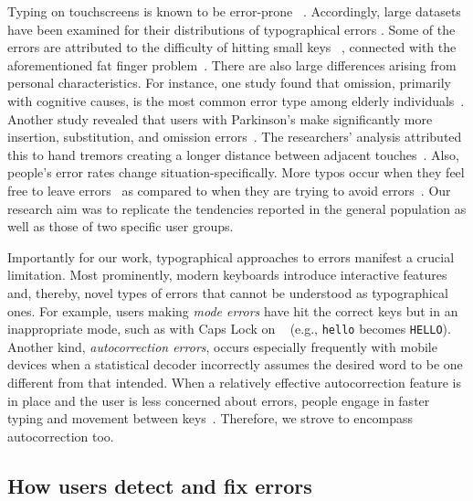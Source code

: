Typing on touchscreens is known to be error-prone ~\cite{hoggan2008investigating,palin2019people}. 
Accordingly, large datasets have been examined for their distributions of typographical errors \cite{palin2019people}.
Some of the errors are attributed to the difficulty of hitting small keys ~\cite{holz2010generalized, holz2011understanding}, 
connected with the aforementioned fat finger problem~\cite{siek2005fat,baudisch2009back}. 
%
There are also large differences arising from personal characteristics. 
For instance, one study found that omission, primarily with cognitive causes, 
is the most common error type among elderly individuals~\cite{nicolau2012elderly}. 
Another study revealed that users with Parkinson's make significantly more insertion, substitution, and omission errors~\cite{wang2021facilitating}. 
The researchers' analysis attributed this to hand tremors creating a longer distance between adjacent touches~\cite{holz2011understanding}.
Also, people's error rates change situation-specifically. More typos occur when they feel free to leave errors~\cite{palin2019people} as compared to when they are trying to avoid errors~\cite{jiang2020we}.
%
Our research aim was to replicate the tendencies reported in the general population as well as those of two specific user groups.

Importantly for our work, typographical approaches to errors manifest a crucial limitation.
Most prominently, modern keyboards introduce interactive features and, thereby, novel types of errors that cannot be understood as typographical ones.
For example, users making \emph{mode errors} have hit the correct keys but in an inappropriate mode, such as with Caps Lock on ~\cite{norman1988psychology} (e.g., \texttt{hello} becomes \texttt{HELLO}).
Another kind, \emph{autocorrection errors}, occurs especially frequently with mobile devices when a statistical decoder incorrectly assumes the desired word to be one different from that intended. 
When a relatively effective autocorrection feature is in place and the user is less concerned about errors, people engage in faster typing and movement between keys~\cite{banovic2017quantifying, banovic2013effect}.
Therefore, we strove to encompass autocorrection too.

\subsection{How users detect and fix errors}

